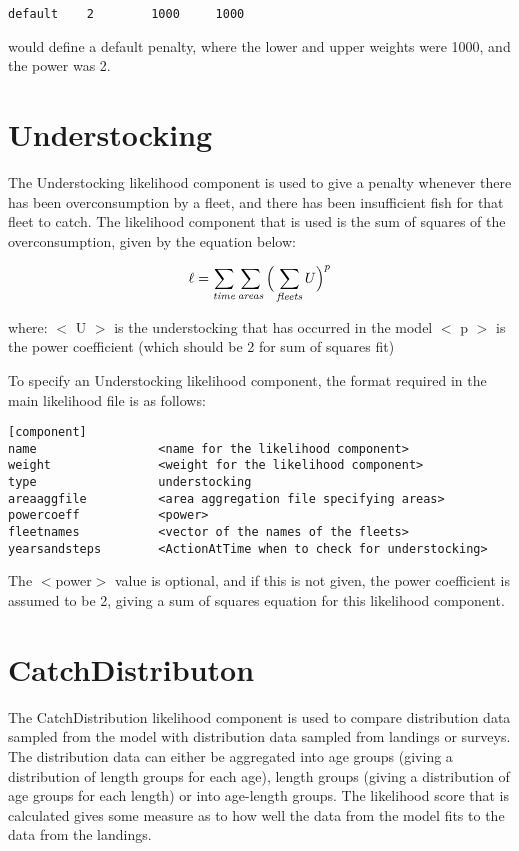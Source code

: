 \documentclass [a4paper, 10pt]{book}
\begin{document}
{\small\begin{verbatim}
default    2        1000     1000
\end{verbatim}}

would define a default penalty, where the lower and upper weights were 1000, and the power was 2.

\section{Understocking}\label{sec:understocking}
The Understocking likelihood component is used to give a penalty whenever there has been overconsumption by a fleet, and there has been insufficient fish for that fleet to catch.  The likelihood component that is used is the sum of squares of the overconsumption, given by the equation below:

\begin{equation}\label{eq:understocking}
\ell = \sum_{\it time}\sum_{\it areas} \Big(\sum_{\it fleets} U \Big)^p
\end{equation}

where:\newline
$<$ U $>$ is the understocking that has occurred in the model\newline
$<$ p $>$ is the power coefficient (which should be 2 for sum of squares fit)

\bigskip
To specify an Understocking likelihood component, the format required in the main likelihood file is as follows:

{\small\begin{verbatim}
[component]
name                 <name for the likelihood component>
weight               <weight for the likelihood component>
type                 understocking
areaaggfile          <area aggregation file specifying areas>
powercoeff           <power>
fleetnames           <vector of the names of the fleets>
yearsandsteps        <ActionAtTime when to check for understocking>
\end{verbatim}}

The $<$power$>$ value is optional, and if this is not given, the power coefficient is assumed to be 2, giving a sum of squares equation for this likelihood component.

\section{CatchDistributon}\label{sec:catchdist}
The CatchDistribution likelihood component is used to compare distribution data sampled from the model with distribution data sampled from landings or surveys.  The distribution data can either be aggregated into age groups (giving a distribution of length groups for each age), length groups (giving a distribution of age groups for each length) or into age-length groups.  The likelihood score that is calculated gives some measure as to how well the data from the model fits to the data from the landings.
\end{document}
